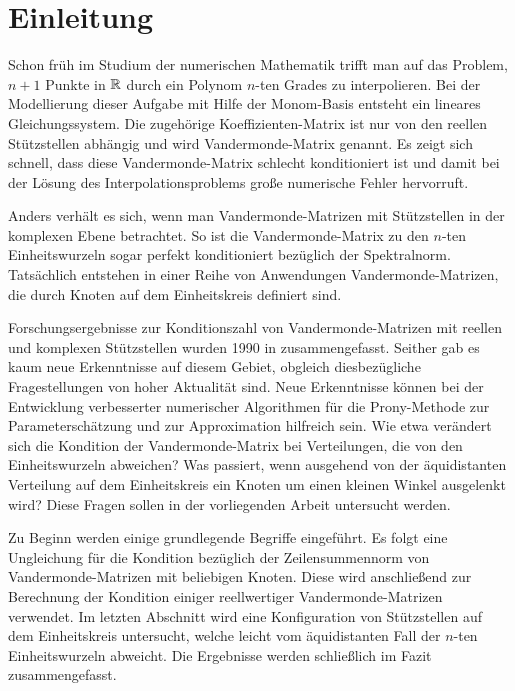 \chapter{Einleitung}


Schon früh im Studium der numerischen Mathematik trifft man auf das Problem,
$n+1$ Punkte in $\mathbb{R}$ durch ein Polynom $n$-ten Grades zu interpolieren.  Bei
der Modellierung dieser Aufgabe mit Hilfe der Monom-Basis entsteht ein lineares
Gleichungssystem.  Die zugehörige Koeffizienten-Matrix ist nur von den reellen
Stützstellen abhängig und wird Vandermonde-Matrix genannt.  Es zeigt sich
schnell, dass diese Vandermonde-Matrix schlecht konditioniert ist und damit bei
der Lösung des Interpolationsproblems große numerische Fehler hervorruft.

Anders verhält es sich, wenn man Vandermonde-Matrizen mit Stützstellen in der
komplexen Ebene betrachtet.  So ist die Vandermonde-Matrix zu den $n$-ten
Einheitswurzeln sogar perfekt konditioniert bezüglich der Spektralnorm.
Tatsächlich entstehen in einer Reihe von Anwendungen Vandermonde-Matrizen, die
durch Knoten auf dem Einheitskreis definiert sind.

Forschungsergebnisse zur Konditionszahl von Vandermonde-Matrizen mit reellen
und komplexen Stützstellen wurden 1990 in \cite{gautschi1} zusammengefasst.
Seither gab es kaum neue Erkenntnisse auf diesem Gebiet, obgleich
diesbezügliche Fragestellungen von hoher Aktualität sind.
Neue Erkenntnisse können bei der Entwicklung verbesserter numerischer
Algorithmen für die Prony-Methode zur Parameterschätzung und zur Approximation
hilfreich sein.
Wie etwa verändert sich die Kondition der Vandermonde-Matrix bei Verteilungen,
die von den Einheitswurzeln abweichen?  Was passiert, wenn ausgehend von der
äquidistanten Verteilung auf dem Einheitskreis ein Knoten um einen kleinen
Winkel ausgelenkt wird?
Diese Fragen sollen in der vorliegenden Arbeit untersucht werden.

Zu Beginn werden einige grundlegende Begriffe eingeführt. Es folgt eine
Ungleichung für die Kondition bezüglich der Zeilensummennorm von
Vandermonde-Matrizen mit beliebigen Knoten.  Diese wird anschließend zur
Berechnung der Kondition einiger reellwertiger Vandermonde-Matrizen verwendet.
Im letzten Abschnitt wird eine Konfiguration von Stützstellen auf dem
Einheitskreis untersucht, welche leicht vom äquidistanten Fall der $n$-ten
Einheitswurzeln abweicht. Die Ergebnisse werden schließlich im Fazit
zusammengefasst.
